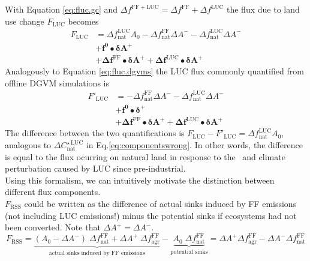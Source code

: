 With Equation \ref{eq:fluc.gc} and $\Delta f^{\mathrm{FF+LUC}} = \Delta f^{\mathrm{FF}} + \Delta f^{\mathrm{LUC}}$ the flux due to land use change $F_{\mathrm{LUC}}$ becomes
\begin{align}
F_{\mathrm{LUC}} &= \Delta f^{\mathrm{LUC}}_{\mathrm{nat}}A_0 - \Delta f^{\mathrm{FF}}_{\mathrm{nat}}\Delta A^- - \Delta f^{\mathrm{LUC}}_{\mathrm{nat}}\Delta A^-\\
& + \mathbf{f^0}\bullet \mathbf{\delta A^+}\\
& + \mathbf{\Delta f^{\mathrm{FF}}}\bullet \mathbf{\delta A^+} + \mathbf{\Delta f^{\mathrm{LUC}}}\bullet \mathbf{\delta A^+}
\end{align}
Analogously to Equation \ref{eq:fluc.dgvms} the LUC flux commonly quantified from offline DGVM simulations is 
\begin{align}
F'_{\mathrm{LUC}} &= - \Delta f^{\mathrm{FF}}_{\mathrm{nat}}\Delta A^- - \Delta f^{\mathrm{LUC}}_{\mathrm{nat}}\Delta A^-\\
& + \mathbf{f^0}\bullet \mathbf{\delta^+}\\
& + \mathbf{\Delta f^{\mathrm{FF}}}\bullet \mathbf{\delta A^+} + \mathbf{\Delta f^{\mathrm{LUC}}}\bullet \mathbf{\delta A^+}
\end{align}
The difference between the two quantifications is $F_{\mathrm{LUC}} - F'_{\mathrm{LUC}} = \Delta f^{\mathrm{LUC}}_{\mathrm{nat}}A_0$, analogous to $\Delta C^{\star\,\mathrm{LUC}}_{\mathrm{nat}}$ in Eq.\ref{eq:componentswrong}. In other words, the difference is equal to the flux ocurring on natural land in response to the \coo\ and climate perturbation caused by LUC since pre-industrial.\\

Using this formalism, we can intuitively motivate the distinction between different flux components.\\

 $F_{\mathrm{RSS}}$ could be written as the difference of actual sinks induced by FF emissions (not including LUC emissions!) minus the potential sinks if ecosystems had not been converted. Note that $\Delta A^+ = \Delta A^-$.
\begin{equation}
F_{\mathrm{RSS}} = \underbrace{(A_0-\Delta A^-)\;\Delta f_{\mathrm{nat}}^{\mathrm{FF}} + \Delta A^+\;\Delta f_{\mathrm{agr}}^{\mathrm{FF}}  }_{\text{actual sinks induced by FF emissions}}  -  \underbrace{  A_0\;\Delta f_{\mathrm{nat}}^{\mathrm{FF}}  }_{\text{potential sinks}} = \Delta A^+ \Delta f_{\text{agr}}^{\text{FF}} -  \Delta A^- \Delta f_{\text{nat}}^{\text{FF}}
\end{equation}

